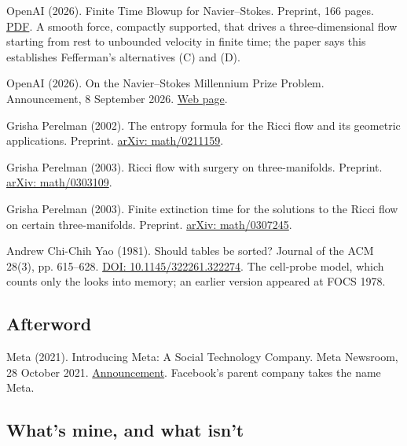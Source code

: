 \noindent OpenAI (2026). Finite Time Blowup for Navier--Stokes. Preprint, 166 pages. \href{https://cdn.openai.com/pdf/32d9f210-8b73-45e0-91bc-82a30aef8a9a/navier-stokes.pdf}{PDF}. A smooth force, compactly supported, that drives a three-dimensional flow starting from rest to unbounded velocity in finite time; the paper says this establishes Fefferman's alternatives (C) and (D).
\par\medskip

\noindent OpenAI (2026). On the Navier--Stokes Millennium Prize Problem. Announcement, 8 September 2026. \href{https://openai.com/index/navier-stokes-solution/}{Web page}.
\par\medskip

\noindent Grisha Perelman (2002). The entropy formula for the Ricci flow and its geometric applications. Preprint. \href{https://arxiv.org/abs/math/0211159}{arXiv: math/0211159}.
\par\medskip

\noindent Grisha Perelman (2003). Ricci flow with surgery on three-manifolds. Preprint. \href{https://arxiv.org/abs/math/0303109}{arXiv: math/0303109}.
\par\medskip

\noindent Grisha Perelman (2003). Finite extinction time for the solutions to the Ricci flow on certain three-manifolds. Preprint. \href{https://arxiv.org/abs/math/0307245}{arXiv: math/0307245}.
\par\medskip

\noindent Andrew Chi-Chih Yao (1981). Should tables be sorted? Journal of the ACM 28(3), pp. 615--628. \href{https://doi.org/10.1145/322261.322274}{DOI: 10.1145/322261.322274}. The cell-probe model, which counts only the looks into memory; an earlier version appeared at FOCS 1978.
\par\medskip

\subsection*{Afterword}

\noindent Meta (2021). Introducing Meta: A Social Technology Company. Meta Newsroom, 28 October 2021. \href{https://about.fb.com/news/2021/10/facebook-company-is-now-meta/}{Announcement}. Facebook's parent company takes the name Meta.
\par\medskip

\subsection*{What's mine, and what isn't}

